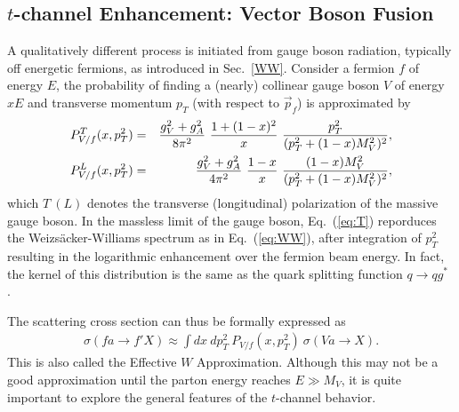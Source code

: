 \documentclass[12pt,prd,aps,floats,preprintnumbers,preprint,superscriptaddress,floatfix,nofootinbib]{revtex4}
\def\pt{p_T^{}}
\def\bea{\begin{eqnarray}}
\def\eea{\end{eqnarray}}
\begin{document}
\subsection{$t$-channel Enhancement: Vector Boson Fusion}
\label{EWA}

A qualitatively different process is initiated from gauge boson radiation,
typically off energetic fermions, as introduced in Sec.~\ref{WW}. 
Consider a fermion $f$ of energy $E$, the probability of finding a (nearly)
collinear gauge boson $V$ of energy $xE$ and transverse momentum
$\pt$ (with respect to $\vec p_f$) is approximated by \cite{sally,gordy}
\bea
\label{eq:T}
P^T_{V/f}(x,p_T^2)  &=& \frac{g_V^2+g_A^2}{ 8\pi^2}\
{ 1+(1-x)^2\over  x}\ { p_T^2\over (p_T^2+(1-x)M_V^2)^2}, \\
P^L_{V/f}(x,p_T^2) &=& \frac{g_V^2+g_A^2}{ 4\pi^2}\
{1-x\over  x}\ { (1-x)M_V^2\over (p_T^2+(1-x)M_V^2)^2},
\label{eq:L}
\eea
which $T\ (L)$ denotes the transverse (longitudinal) polarization of the
massive gauge boson. 
In the massless limit of the gauge boson, Eq.~(\ref{eq:T}) reporduces
the Weizs\"acker-Williams spectrum as in Eq.~(\ref{eq:WW}),
after integration of $p_T^2$ resulting in the logarithmic enhancement
over the fermion beam energy.  
In fact, the kernel of this distribution is the same as the quark 
splitting function $q\to qg^*$ \cite{esw,george}.

The scattering cross section can thus be formally expressed as
\bea
\sigma(f a \to f' X) \approx \int dx\ dp_T^2\ P_{V/f}(x, p_T^2)\  \sigma(V a\to X).
\label{ewa}
\eea
This is also called the Effective $W$ Approximation. Although this may
not be a good approximation until the parton energy reaches
$E\gg M_V$, it is quite important to
explore the general features of the $t$-channel behavior. 
\end{document}
